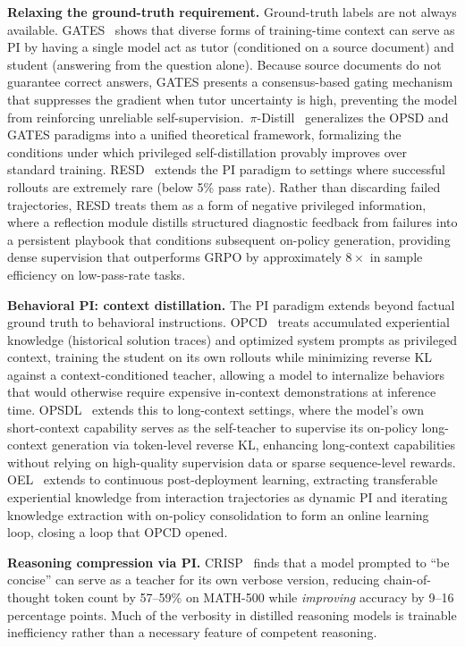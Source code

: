 \documentclass{article} %
\begin{document}
\textbf{Relaxing the ground-truth requirement.} Ground-truth labels are not always available. GATES~\citep{2602.20574} shows that diverse forms of training-time context can serve as PI by having a single model act as tutor (conditioned on a source document) and student (answering from the question alone). Because source documents do not guarantee correct answers, GATES presents a consensus-based gating mechanism that suppresses the gradient when tutor uncertainty is high, preventing the model from reinforcing unreliable self-supervision.~$\pi$-Distill~\citep{2602.04942} generalizes the OPSD and GATES paradigms into a unified theoretical framework, formalizing the conditions under which privileged self-distillation provably improves over standard training. RESD~\citep{2605.12741} extends the PI paradigm to settings where successful rollouts are extremely rare (below 5\% pass rate). Rather than discarding failed trajectories, RESD treats them as a form of negative privileged information, where a reflection module distills structured diagnostic feedback from failures into a persistent playbook that conditions subsequent on-policy generation, providing dense supervision that outperforms GRPO by approximately $8\times$ in sample efficiency on low-pass-rate tasks.

\textbf{Behavioral PI: context distillation.} The PI paradigm extends beyond factual ground truth to behavioral instructions. OPCD~\citep{2602.12275} treats accumulated experiential knowledge (historical solution traces) and optimized system prompts as privileged context, training the student on its own rollouts while minimizing reverse KL against a context-conditioned teacher, allowing a model to internalize behaviors that would otherwise require expensive in-context demonstrations at inference time. OPSDL~\citep{2604.17535} extends this to long-context settings, where the model's own short-context capability serves as the self-teacher to supervise its on-policy long-context generation via token-level reverse KL, enhancing long-context capabilities without relying on high-quality supervision data or sparse sequence-level rewards. OEL~\citep{2603.16856} extends to continuous post-deployment learning, extracting transferable experiential knowledge from interaction trajectories as dynamic PI and iterating knowledge extraction with on-policy consolidation to form an online learning loop, closing a loop that OPCD opened.

\textbf{Reasoning compression via PI.} CRISP~\citep{2603.05433} finds that a model prompted to ``be concise'' can serve as a teacher for its own verbose version, reducing chain-of-thought token count by 57--59\% on MATH-500 while \emph{improving} accuracy by 9--16 percentage points. Much of the verbosity in distilled reasoning models is trainable inefficiency rather than a necessary feature of competent reasoning.
\end{document}
